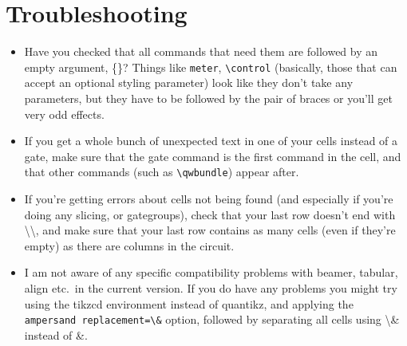 \documentclass[aps,pra,10pt,nofootinbib]{revtex4-2}
\begin{document}
\section{Troubleshooting}\label{sec:trouble}
\begin{itemize}
\item Have you checked that all commands that need them are followed by an empty argument, \{\}? Things like \verb!meter!, \verb!\control! (basically, those that can accept an optional styling parameter) look like they don't take any parameters, but they have to be followed by the pair of braces or you'll get very odd effects.
\item If you get a whole bunch of unexpected text in one of your cells instead of a gate, make sure that the gate command is the first command in the cell, and that other commands (such as \verb!\qwbundle!) appear after.
\item If you're getting errors about cells not being found (and especially if you're doing any slicing, or gategroups), check that your last row doesn't end with \textbackslash\textbackslash, and make sure that your last row contains as many cells (even if they're empty) as there are columns in the circuit.
\item I am not aware of any specific compatibility problems with beamer, tabular, align etc.\ in the current version. If you do have any problems you might try using the tikzcd environment instead of quantikz, and applying the \texttt{ampersand replacement=\textbackslash\&} option, followed by separating all cells using \textbackslash\& instead of \&.

\end{itemize}
\end{document}
